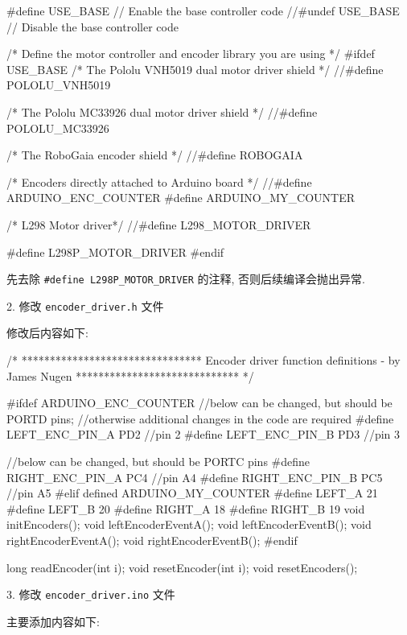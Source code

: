 \documentclass[openany, fontset=windowsold]{ctexbook}
\theoremstyle{kaiti}
\theoremstyle{normal}
\begin{document}
\begin{cpp}
  #define USE_BASE      // Enable the base controller code
  //#undef USE_BASE     // Disable the base controller code

  /* Define the motor controller and encoder library you are using */
  #ifdef USE_BASE
    /* The Pololu VNH5019 dual motor driver shield */
    //#define POLOLU_VNH5019

    /* The Pololu MC33926 dual motor driver shield */
    //#define POLOLU_MC33926

    /* The RoboGaia encoder shield */
    //#define ROBOGAIA

    /* Encoders directly attached to Arduino board */
    //#define ARDUINO_ENC_COUNTER
    #define ARDUINO_MY_COUNTER

    /* L298 Motor driver*/
    //#define L298_MOTOR_DRIVER

    #define L298P_MOTOR_DRIVER
  #endif
\end{cpp}

先去除 \verb|#define L298P_MOTOR_DRIVER| 的注释, 否则后续编译会抛出异常.

2. 修改 \verb|encoder_driver.h| 文件

修改后内容如下:

\begin{cpp}
  /* ********************************
    Encoder driver function definitions - by James Nugen
    ***************************** */


  #ifdef ARDUINO_ENC_COUNTER
    //below can be changed, but should be PORTD pins; 
    //otherwise additional changes in the code are required
    #define LEFT_ENC_PIN_A PD2  //pin 2
    #define LEFT_ENC_PIN_B PD3  //pin 3

    //below can be changed, but should be PORTC pins
    #define RIGHT_ENC_PIN_A PC4  //pin A4
    #define RIGHT_ENC_PIN_B PC5   //pin A5
  #elif defined ARDUINO_MY_COUNTER
    #define LEFT_A 21
    #define LEFT_B 20
    #define RIGHT_A 18
    #define RIGHT_B 19
    void initEncoders();
    void leftEncoderEventA();
    void leftEncoderEventB();
    void rightEncoderEventA();
    void rightEncoderEventB();
  #endif

  long readEncoder(int i);
  void resetEncoder(int i);
  void resetEncoders();
\end{cpp}

3. 修改 \verb|encoder_driver.ino| 文件

主要添加内容如下:
\end{document}

